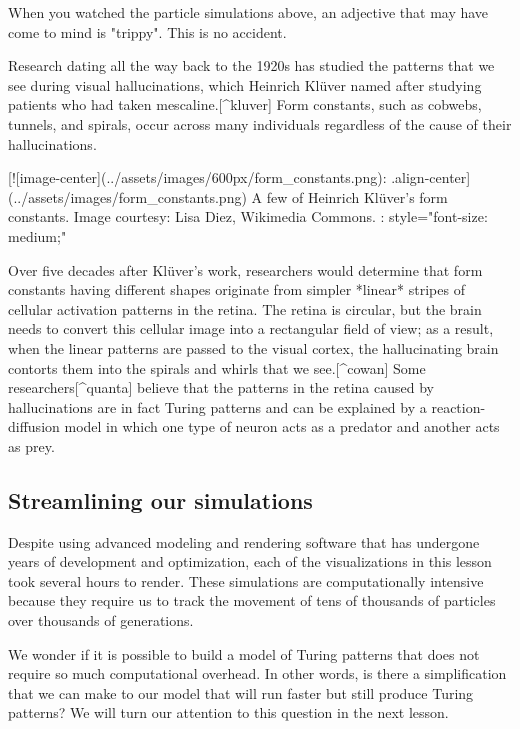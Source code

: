 {{{{{{{{When you watched the particle simulations above, an adjective that may have come to mind is "trippy". This is no accident.

Research dating all the way back to the 1920s has studied the patterns that we see during visual hallucinations, which Heinrich Klüver named  after studying patients who had taken mescaline.[^kluver] Form constants, such as cobwebs, tunnels, and spirals, occur across many individuals regardless of the cause of their hallucinations.

[![image-center](../assets/images/600px/form_constants.png){: .align-center}](../assets/images/form_constants.png)
A few of Heinrich Klüver's form constants. Image courtesy: Lisa Diez, Wikimedia Commons.
{: style="font-size: medium;"}

Over five decades after Klüver's work, researchers would determine that form constants having different shapes originate from simpler *linear* stripes of cellular activation patterns in the retina. The retina is circular, but the brain needs to convert this cellular image into a rectangular field of view; as a result, when the linear patterns are passed to the visual cortex, the hallucinating brain contorts them into the spirals and whirls that we see.[^cowan] Some researchers[^quanta] believe that the patterns in the retina caused by hallucinations are in fact Turing patterns and can be explained by a reaction-diffusion model in which one type of neuron acts as a predator and another acts as prey.

\FloatBarrier
{}
\subsection{Streamlining our simulations}

Despite using advanced modeling and rendering software that has undergone years of development and optimization, each of the visualizations in this lesson took several hours to render. These simulations are computationally intensive because they require us to track the movement of tens of thousands of particles over thousands of generations.

We wonder if it is possible to build a model of Turing patterns that does not require so much computational overhead. In other words, is there a simplification that we can make to our model that will run faster but still produce Turing patterns? We will turn our attention to this question in the next lesson.





















}}}}}}}}

